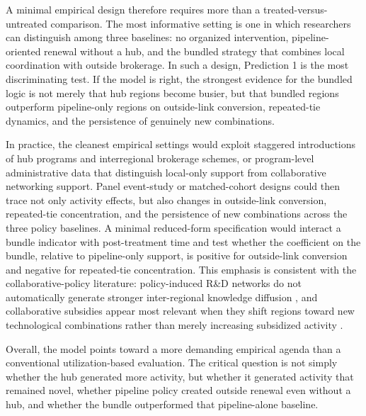 A minimal empirical design therefore requires more than a treated-versus-untreated comparison. The most informative setting is one in which researchers can distinguish among three baselines: no organized intervention, pipeline-oriented renewal without a hub, and the bundled strategy that combines local coordination with outside brokerage. In such a design, Prediction 1 is the most discriminating test. If the model is right, the strongest evidence for the bundled logic is not merely that hub regions become busier, but that bundled regions outperform pipeline-only regions on outside-link conversion, repeated-tie dynamics, and the persistence of genuinely new combinations.

In practice, the cleanest empirical settings would exploit staggered introductions of hub programs and interregional brokerage schemes, or program-level administrative data that distinguish local-only support from collaborative networking support. Panel event-study or matched-cohort designs could then trace not only activity effects, but also changes in outside-link conversion, repeated-tie concentration, and the persistence of new combinations across the three policy baselines. A minimal reduced-form specification would interact a bundle indicator with post-treatment time and test whether the coefficient on the bundle, relative to pipeline-only support, is positive for outside-link conversion and negative for repeated-tie concentration. This emphasis is consistent with the collaborative-policy literature: policy-induced R\&D networks do not automatically generate stronger inter-regional knowledge diffusion \citep{BednarzBroekel2019}, and collaborative subsidies appear most relevant when they shift regions toward new technological combinations rather than merely increasing subsidized activity \citep{MewesBroekel2020}.

Overall, the model points toward a more demanding empirical agenda than a conventional utilization-based evaluation. The critical question is not simply whether the hub generated more activity, but whether it generated activity that remained novel, whether pipeline policy created outside renewal even without a hub, and whether the bundle outperformed that pipeline-alone baseline.
